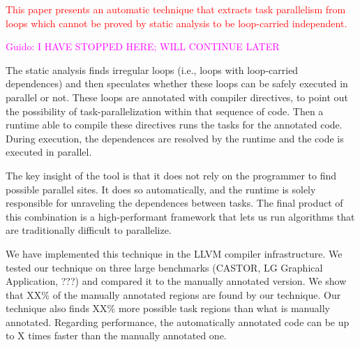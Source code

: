 \documentclass[sigplan,10pt,review,anonymous]{acmart}
\newcommand{\guido}[1]{\noindent\textcolor{magenta}{Guido: {#1}}}
\newcommand{\ed}[1]{\noindent\textcolor{red}{ {#1}}}
\newcommand{\guido}[1]{}
\newcommand{\ed}[1]{}
\begin{document}
\ed{This paper presents an automatic technique that extracts task parallelism from loops which cannot be proved by static analysis to be loop-carried independent. } 

\guido{I HAVE STOPPED HERE; WILL CONTINUE LATER}

The static analysis finds irregular loops (i.e., loops with loop-carried dependences) and then speculates 
whether these loops can be safely executed in parallel or not. These loops
are annotated with compiler directives, to point out the possibility of task-parallelization within that sequence of code. 
Then a runtime able to compile these directives runs the tasks for the annotated code. 
During execution, the dependences are resolved by the runtime and the code is executed in parallel. 

The key insight of the tool is that it does not rely on the programmer to find possible parallel sites. 
It does so automatically, and the runtime is solely responsible for unraveling the dependences between tasks. 
The final product of this combination is a high-performant framework that
lets us run algorithms that are traditionally difficult to parallelize.

We have implemented this technique in the LLVM compiler infrastructure. We tested our technique on three large benchmarks (CASTOR, LG Graphical Application, ???) and compared it to the manually annotated version. We show that XX\% of the manually annotated regions are found by our technique. Our technique also finds XX\% more possible task regions than what is manually annotated. Regarding performance, the automatically annotated code can be up to X times faster than the manually annotated one.


\end{document}
